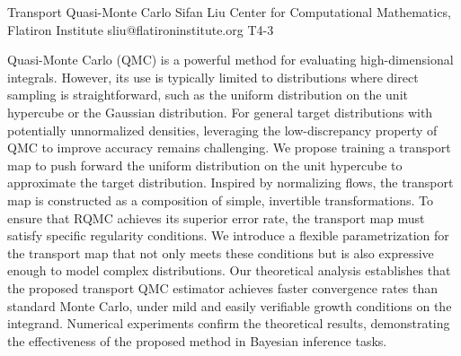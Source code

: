 \begin{talk}
  {Transport Quasi-Monte Carlo}%
  {Sifan Liu}%
  {Center for Computational Mathematics, Flatiron Institute}%
  {sliu@flatironinstitute.org}%
  {}%
  {T4-3}%
			
Quasi-Monte Carlo (QMC) is a powerful method for evaluating high-dimensional integrals. However, its use is typically limited to distributions where direct sampling is straightforward, such as the uniform distribution on the unit hypercube or the Gaussian distribution. For general target distributions with potentially unnormalized densities, leveraging the low-discrepancy property of QMC to improve accuracy remains challenging. We propose training a transport map to push forward the uniform distribution on the unit hypercube to approximate the target distribution. Inspired by normalizing flows, the transport map is constructed as a composition of simple, invertible transformations. To ensure that RQMC achieves its superior error rate, the transport map must satisfy specific regularity conditions. We introduce a flexible parametrization for the transport map that not only meets these conditions but is also expressive enough to model complex distributions. Our theoretical analysis establishes that the proposed transport QMC estimator achieves faster convergence rates than standard Monte Carlo, under mild and easily verifiable growth conditions on the integrand. Numerical experiments confirm the theoretical results, demonstrating the effectiveness of the proposed method in Bayesian inference tasks.


\medskip


\end{talk}

